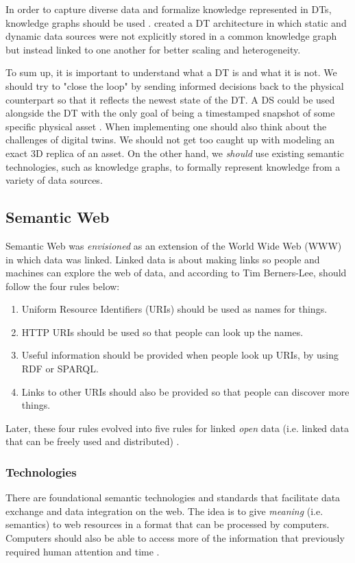 \documentclass{article}
\begin{document}
In order to capture diverse data and formalize knowledge represented in DTs, knowledge graphs should be used \cite{kamburjan_programming_2021, waszak_let_2022}. \citeauthor{waszak_let_2022} created a DT architecture in which static and dynamic data sources were not explicitly stored in a common knowledge graph but instead linked to one another for better scaling and heterogeneity.

To sum up, it is important to understand what a DT is and what it is not. We should try to "close the loop" by sending informed decisions back to the physical counterpart so that it reflects the newest state of the DT. A DS could be used alongside the DT with the only goal of being a timestamped snapshot of some specific physical asset \cite{bergs_concept_2021}. When implementing one should also think about the challenges of digital twins. We should not get too caught up with modeling an exact 3D replica of an asset. On the other hand, we \emph{should} use existing semantic technologies, such as knowledge graphs, to formally represent knowledge from a variety of data sources.


\subsection{Semantic Web}
Semantic Web was \emph{envisioned} as an extension of the World Wide Web (WWW) in which data was linked. Linked data is about making links so people and machines can explore the web of data, and according to Tim Berners-Lee, should follow the four rules \cite{tim_berners-lee_linked_nodate} below: 

\begin{enumerate}
    \item Uniform Resource Identifiers (URIs) should be used as names for things.
    \item HTTP URIs should be used so that people can look up the names.
    \item Useful information should be provided when people look up URIs, by using RDF or SPARQL.
    \item Links to other URIs should also be provided so that people can discover more things.
\end{enumerate}

Later, these four rules evolved into five rules for linked \emph{open} data (i.e. linked data that can be freely used and distributed) \cite{noauthor_5_nodate}.  

\subsubsection{Technologies}\label{subsubsec:Technologies}
There are foundational semantic technologies and standards that facilitate data exchange and data integration on the web. The idea is to give \emph{meaning} (i.e. semantics) to web resources in a format that can be processed by computers. Computers should also be able to access more of the information that previously required human attention and time \cite{hitzler_foundations_2009}.
\end{document}
